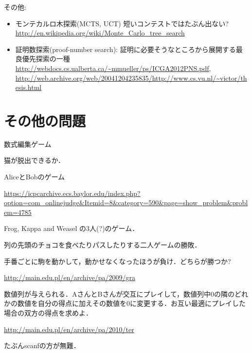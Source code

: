 \begin{versionalpha}
その他:
\begin{itemize}
\item モンテカルロ木探索(MCTS, UCT) 短いコンテストではたぶん出ない? \url{http://en.wikipedia.org/wiki/Monte_Carlo_tree_search}
\item 証明数探索(proof-number search): 証明に必要そうなところから展開する最良優先探索の一種 \url{http://webdocs.cs.ualberta.ca/~mmueller/ps/ICGA2012PNS.pdf},
  \url{http://web.archive.org/web/20041204235835/http://www.cs.vu.nl/~victor/thesis.html}
\end{itemize}


\section{その他の問題}

\begin{pbox}
数式編集ゲーム  

\end{pbox}

\begin{pbox}
猫が脱出できるか．
  
\end{pbox}

\begin{pbox}
AliceとBobのゲーム

\url{https://icpcarchive.ecs.baylor.edu/index.php?option=com_onlinejudge&Itemid=8&category=590&page=show_problem&problem=4785}
\end{pbox}

\begin{pbox}[Iyasugigappa]
Frog, Kappa and Weasel の3人(?)のゲーム．

\end{pbox}

\begin{pbox}
列の先頭のチョコを食べたりパスしたりする二人ゲームの勝敗．

\end{pbox}

\begin{pbox}
手番ごとに駒を動かして，動かせなくなったほうが負け．どちらが勝つか?

\url{http://main.edu.pl/en/archive/pa/2009/gra}
\end{pbox}

\begin{pbox}[Termites]
数値列が与えられる．AさんとBさんが交互にプレイして，数値列中0の隣のどれ
かの数値を自分の得点に加えその数値を0に変更する．お互い最適にプレイした場合の双方の得点を求めよ．

\url{http://main.edu.pl/en/archive/pa/2010/ter}
\end{pbox}

たぶんscanfの方が無難．

\end{versionalpha}

